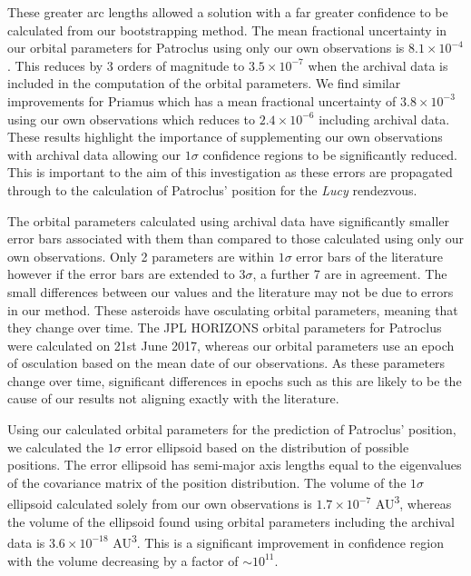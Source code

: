 \documentclass[10pt, twocolumn]{revtex4}    %
\begin{document}
These greater arc lengths allowed a solution with a far greater confidence to be calculated from our bootstrapping method. The mean fractional uncertainty in our orbital parameters for Patroclus using only our own observations is $8.1 \times 10^{-4}$. This reduces by 3 orders of magnitude to $3.5 \times 10^{-7}$ when the archival data is included in the computation of the orbital parameters. We find similar improvements for Priamus which has a mean fractional uncertainty of $3.8 \times 10^{-3}$ using our own observations which reduces to $2.4 \times 10^{-6}$ including archival data. These results highlight the importance of supplementing our own observations with archival data allowing our $1\sigma$ confidence regions to be significantly reduced.  This is important to the aim of this investigation as these errors are propagated through to the calculation of Patroclus' position for the \textit{Lucy} rendezvous.

The orbital parameters calculated using archival data have significantly smaller error bars associated with them than compared to those calculated using only our own observations. Only 2 parameters are within $1\sigma$ error bars of the literature however if the error bars are extended to $3\sigma$, a further 7 are in agreement. The small differences between our values and the literature may not be due to errors in our method. These asteroids have osculating orbital parameters, meaning that they change over time. The JPL HORIZONS orbital parameters for Patroclus were calculated on 21st June 2017, whereas our orbital parameters use an epoch of osculation based on the mean date of our observations. As these parameters change over time, significant differences in epochs such as this are likely to be the cause of our results not aligning exactly with the literature.

Using our calculated orbital parameters for the prediction of Patroclus' position, we calculated the $1\sigma$ error ellipsoid based on the distribution of possible positions. The error ellipsoid has semi-major axis lengths equal to the eigenvalues of the covariance matrix of the position distribution. The volume of the $1\sigma$ ellipsoid calculated solely from our own observations is $1.7 \times 10^{-7}$ \si{AU^{3}}, whereas the volume of the ellipsoid found using orbital parameters including the archival data is $3.6 \times 10^{-18}$ \si{AU\cubed}. This is a significant improvement in confidence region with the volume decreasing by a factor of ${\sim}10^{11}$. 
\end{document}
